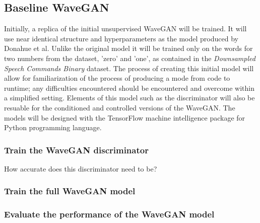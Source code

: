 \documentclass[a4paper, titlepage]{article}
\begin{document}
\subsection{Baseline WaveGAN}

Initially, a replica of the initial unsupervised WaveGAN will be trained.
It will use near identical structure and hyperparameters as the model produced by Donahue et al.
Unlike the original model it will be trained only on the words for two numbers from the dataset, 'zero' and 'one', as contained in the \textit{Downsampled Speech Commands Binary} dataset.
\newline
\newline
The process of creating this initial model will allow for familiarization of the process of producing a mode from code to runtime; any difficulties encountered should be encountered and overcome within a simplified setting.
Elements of this model such as the discriminator will also be resuable for the conditioned and controlled versions of the WaveGAN.
\newline
\newline
The models will be designed with the TensorFlow machine intelligence package for Python programming language.

\subsubsection{Train the WaveGAN discriminator}

How accurate does this discriminator need to be?

\subsubsection{Train the full WaveGAN model}

\subsubsection{Evaluate the performance of the WaveGAN model}
\end{document}
